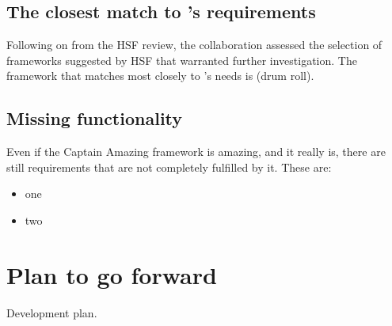 \documentclass[../main-00.tex]{subfiles}
\begin{document}
\subsection{The closest match to 's requirements}

Following on from the HSF review, the  collaboration assessed the selection of frameworks suggested by HSF that warranted further investigation.  The framework that matches most closely to 's needs is (drum roll).

\subsection{Missing functionality}

Even if the Captain Amazing framework is amazing, and it really is, there are still requirements that are not completely fulfilled by it.  These are:

\begin{itemize}
    \item one
    \item two
\end{itemize}

\section{Plan to go forward }

Development plan.

%
\end{document}

